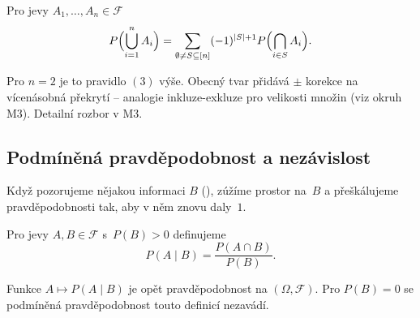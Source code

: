 \documentclass[11pt,a4paper]{article}
\begin{document}
\begin{veta}
Pro jevy $A_1,\dots,A_n\in\mathcal{F}$
\[
P\Bigl(\bigcup_{i=1}^n A_i\Bigr)=\sum_{\emptyset\ne S\subseteq[n]}(-1)^{|S|+1}P\Bigl(\bigcap_{i\in S} A_i\Bigr).
\]
\end{veta}

\begin{intuice}
Pro $n=2$ je to pravidlo $(3)$ výše. Obecný tvar přidává $\pm$ korekce na vícenásobná překrytí -- analogie inkluze-exkluze pro velikosti množin (viz okruh M3). Detailní rozbor v M3.
\end{intuice}

\subsection{Podmíněná pravděpodobnost a nezávislost}

Když pozorujeme nějakou informaci $B$ (), zúžíme prostor na~$B$ a přeškálujeme pravděpodobnosti tak, aby v něm znovu daly~$1$.

\begin{definice}
Pro jevy $A,B\in\mathcal{F}$ s~$P(B)>0$ definujeme
\[
P(A\mid B)=\frac{P(A\cap B)}{P(B)}.
\]
\end{definice}

\begin{poznamka}
Funkce $A\mapsto P(A\mid B)$ je opět pravděpodobnost na $(\Omega,\mathcal{F})$. Pro $P(B)=0$ se podmíněná pravděpodobnost touto definicí nezavádí.
\end{poznamka}

\begin{center}
\end{center}
\end{document}
